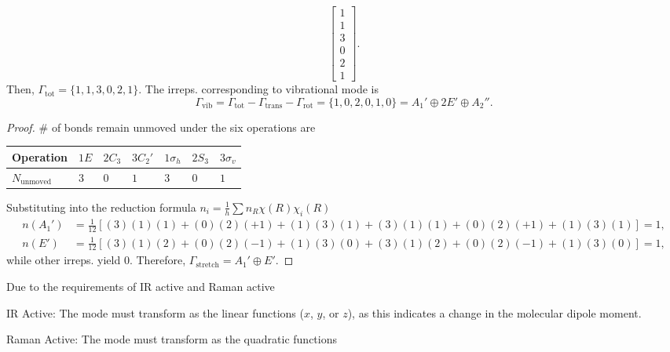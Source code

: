 \begin{solution}
\begin{enumext}
\begin{enumext}
\[          \begin{bmatrix}
            1\\1\\3\\0\\2\\1
          \end{bmatrix}.
      \]
      Then, $\Gamma_\text{tot} = \{1, 1, 3, 0, 2, 1\}$.
      The irreps. corresponding to vibrational mode is
      \[
        \Gamma_\text{vib}
      = \Gamma_\text{tot} - \Gamma_\text{trans} - \Gamma_\text{rot}
      = \{1, 0, 2, 0, 1, 0\} = A_1' \oplus 2E' \oplus A_2''.
      \]
    \end{enumext}
    \item \begin{proof}
      \# of bonds remain unmoved under the six operations are
      \begin{center}
        \begin{tabular}{*7l}
          \toprule
          Operation & $1E$        & $2C_3$ & $3C_2'$
                    & $1\sigma_h$ & $2S_3$ & $3\sigma_v$\\
          \midrule
          $N_\text{unmoved}$ & $3$ & $0$ & $1$ & $3$ & $0$ & $1$\\
          \bottomrule
        \end{tabular}
      \end{center}
      Substituting into the reduction formula
      $n_i = \frac1h \sum n_R \chi(R) \chi_i(R)$
      \begin{align*}
        n(A_1') & = \frac1{12}[(3)(1)(1) + (0)(2)(+1) + (1)(3)(1)
                             + (3)(1)(1) + (0)(2)(+1) + (1)(3)(1)] = 1,\\
        n(E')   & = \frac1{12}[(3)(1)(2) + (0)(2)(-1) + (1)(3)(0)
                             + (3)(1)(2) + (0)(2)(-1) + (1)(3)(0)] = 1,
      \end{align*}
      while other irreps. yield $0$.
      Therefore, $\Gamma_\text{stretch} = A_1' \oplus E'$.
    \end{proof}
    \item Due to the requirements of IR active and Raman active
    \begin{enumext}
      \item IR Active: The mode must transform as the linear functions
      ($x$, $y$, or $z$), as this indicates a change in the molecular
      dipole moment.
      \item Raman Active: The mode must transform as the quadratic functions

\end{enumext}
\end{enumext}
\end{solution}
